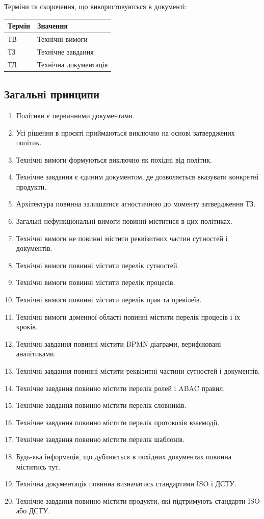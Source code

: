 \documentclass{article}
\begin{document}
Терміни та скорочення, що використовуються в документі:

\begin{longtable}{p{4cm}p{10cm}}
\toprule
\textbf{Термін} & \textbf{Значення} \\
\midrule
ТВ & Технічні вимоги \\
ТЗ & Технічне завдання \\
ТД & Технічна документація \\
\bottomrule
\end{longtable}

\subsection*{Загальні принципи}

\begin{enumerate}
\item Політики є первинними документами.
\item Усі рішення в проєкті приймаються виключно на основі затверджених політик.
\item Технічні вимоги формуються виключно як похідні від політик.
\item Технічне завдання є єдиним документом, де дозволяється вказувати конкретні продукти.
\item Архітектура повинна залишатися агностичною до моменту затвердження ТЗ.
\item Загальні нефункціональні вимоги повинні міститися в цих політиках.
\item Технічні вимоги не повинні містити реквізитних частин сутностей і документів.
\item Технічні вимоги повинні містити перелік сутностей.
\item Технічні вимоги повинні містити перелік процесів.
\item Технічні вимоги повинні містити перелік прав та превілеїв.
\item Технічні вимоги доменної області повинні містити перелік процесів і їх кроків.
\item Технічні завдання повинні містити BPMN діаграми, верифіковані аналітиками.
\item Технічні завдання повинні містити реквізитні частини сутностей і документів.
\item Технічне завдання повинно містити перелік ролей і ABAC правил.
\item Технічне завдання повинно містити перелік словників.
\item Технічне завдання повинно містити перелік протоколів взаємодії.
\item Технічне завдання повинно містити перелік шаблонів.
\item Будь-яка інформація, що дублюється в похідних документах повинна міститись тут.
\item Технічна документація повинна визначатись стандартами ISO і ДСТУ.
\item Технічне завдання повинно містити продукти, які підтримують стандарти ISO або ДСТУ.
\end{enumerate}
\end{document}
